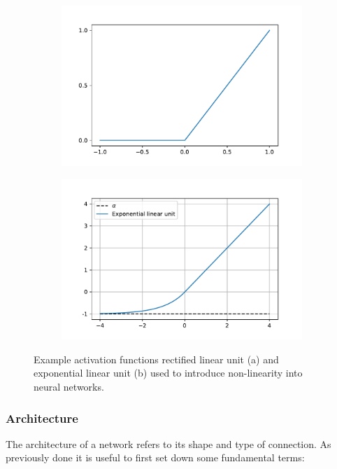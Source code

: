 			\begin{figure}
				\begin{subfigure}{.49\textwidth}
					\centering
					\includegraphics[width=\textwidth]{images/ReLU.pdf}
					\label{Fig:ReLU}
				\end{subfigure}
				\begin{subfigure}{.49\textheight}
					\centering
					\includegraphics[width=\textwidth]{images/Elu.pdf}
					\label{Fig:ELU}
				\end{subfigure}
				\caption{Example activation functions rectified linear unit (a) and  exponential linear unit (b) used to introduce non-linearity into neural networks.}
				\label{Fig:ReLUELU}
			\end{figure}
		
		\subsubsection{Architecture}
			The architecture of a network refers to its shape and type of connection. As previously done it is useful to first set down some fundamental terms:
